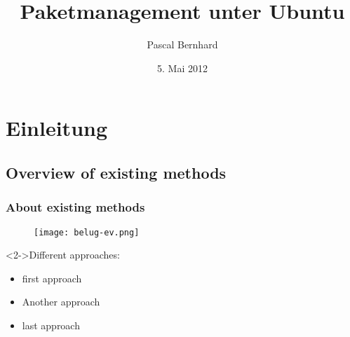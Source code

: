 \documentclass{beamer}
\title[kurzer Titel]{Paketmanagement unter Ubuntu}
\author[Pascal Bernhard]{Pascal Bernhard}
\institute[BeLUG]{Berliner Linux User Group}
\date{5. Mai 2012}
\begin{document}
 


\frame{\titlepage}
 
\frame{\tableofcontents}

\section{Einleitung}
\subsection[Overview]{Overview of existing methods}
\begin{frame}
\frametitle{About existing methods}
 
\begin{figure}[\ht]
\texttt{[image: belug-ev.png]}
\end{figure}
 
\begin{block}<2->{Different approaches:}
\begin{itemize}
\item<2-> first approach
\item<3-> Another approach
\item<4-> last approach
\end{itemize}
\end{block}
\end{frame}
\end{document}
